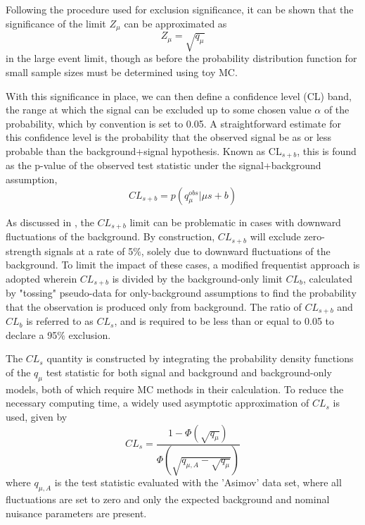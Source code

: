 Following the procedure used for exclusion significance, it can be shown that the significance of the limit $Z_\mu$ can be approximated as
\begin{equation}
	Z_\mu = \sqrt{q_\mu}
\end{equation}
in the large event limit, though as before the probability distribution function for small sample sizes must be determined using toy MC.

With this significance in place, we can then define a confidence level (CL) band, the range at which the signal can be excluded up to some chosen value $\alpha$ of the probability, which by convention is set to 0.05.
A straightforward estimate for this confidence level is the probability that the observed signal be as or less probable than the background+signal hypothesis.
Known as CL$_{s+b}$, this is found as the p-value of the observed test statistic under the signal+background assumption,
\begin{equation}
	CL_{s+b} = p(q_{\mu}^{obs}|\mu s +b)
\end{equation}

As discussed in \cite{ATLAS:2011tau}, the $CL_{s+b}$ limit can be problematic in cases with downward fluctuations of the background. 
By construction, $CL_{s+b}$ will exclude zero-strength signals at a rate of 5$\%$, solely due to downward fluctuations of the background.
To limit the impact of these cases, a modified frequentist approach is adopted wherein $CL_{s+b}$ is divided by the background-only limit $CL_b$, calculated by "tossing" pseudo-data for only-background assumptions to find the probability that the observation is produced only from background.
The ratio of $CL_{s+b}$ and $CL_{b}$ is referred to as $CL_s$, and is required to be less than or equal to 0.05 to declare a 95$\%$ exclusion. 

The $CL_s$ quantity is constructed by integrating the probability density functions of the $q_\mu$ test statistic for both signal and background and background-only models, both of which require MC methods in their calculation. 
To reduce the necessary computing time, a widely used asymptotic approximation of $CL_s$ is used, given by
\begin{equation}
	CL_s = \frac{1-\Phi(\sqrt{q_\mu})}{\Phi(\sqrt{q_{\mu,A}-\sqrt{q_\mu}})}
\end{equation}
where $q_{\mu,A}$ is the test statistic evaluated with the 'Asimov' data set, where all fluctuations are set to zero and only the expected background and nominal nuisance parameters are present.

